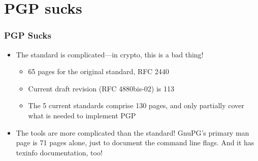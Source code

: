\documentclass[aspectratio=1610,bigger,utf8]{beamer}
\begin{document}
\section{PGP sucks}

\begin{frame}
	\frametitle{PGP Sucks}
	\begin{itemize}
		\item The standard is complicated---in crypto, this is a bad thing!
			\begin{itemize}
				\item 65 pages for the original standard, RFC 2440
				\item Current draft revision 
					(\alert{RFC 4880bis-02}) is 113
				\item The 5 current standards comprise 130
					pages, and only partially cover what is
					needed to implement PGP
			\end{itemize}
		\item The \alert{tools} are more complicated than the standard!
			GnuPG's primary man page is 71 pages alone, just to
			document the command line flags. And it has texinfo
			documentation, too!
	\end{itemize}
\end{frame}
\end{document}
